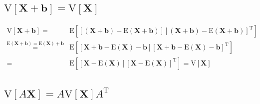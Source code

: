 \documentclass[
]{book}
\theoremstyle{definition}
\theoremstyle{definition}
\theoremstyle{definition}
\theoremstyle{definition}
\theoremstyle{remark}
\begin{document}
\hypertarget{mathrmvleftboldsymbolxboldsymbolbrightmathrmvleftboldsymbolxright}{%
\subsection{\texorpdfstring{\(\mathrm{V}\left[\boldsymbol{X}+\boldsymbol{b}\right]=\mathrm{V}\left[\boldsymbol{X}\right]\)}{\textbackslash mathrm\{V\}\textbackslash left{[}\textbackslash boldsymbol\{X\}+\textbackslash boldsymbol\{b\}\textbackslash right{]}=\textbackslash mathrm\{V\}\textbackslash left{[}\textbackslash boldsymbol\{X\}\textbackslash right{]}}}\label{mathrmvleftboldsymbolxboldsymbolbrightmathrmvleftboldsymbolxright}}

\begin{align*}
\mathrm{V}\left[\boldsymbol{X}+\boldsymbol{b}\right]= & \mathrm{E}\left[\left[\left(\boldsymbol{X}+\boldsymbol{b}\right)-\mathrm{E}\left(\boldsymbol{X}+\boldsymbol{b}\right)\right]\left[\left(\boldsymbol{X}+\boldsymbol{b}\right)-\mathrm{E}\left(\boldsymbol{X}+\boldsymbol{b}\right)\right]^{\mathrm{T}}\right]\\
\overset{\mathrm{E}\left(\boldsymbol{X}+\boldsymbol{b}\right)=\mathrm{E}\left(\boldsymbol{X}\right)+\boldsymbol{b}}{=} & \mathrm{E}\left[\left[\boldsymbol{X}+\boldsymbol{b}-\mathrm{E}\left(\boldsymbol{X}\right)-\boldsymbol{b}\right]\left[\boldsymbol{X}+\boldsymbol{b}-\mathrm{E}\left(\boldsymbol{X}\right)-\boldsymbol{b}\right]^{\mathrm{T}}\right]\\
= & \mathrm{E}\left[\left[\boldsymbol{X}-\mathrm{E}\left(\boldsymbol{X}\right)\right]\left[\boldsymbol{X}-\mathrm{E}\left(\boldsymbol{X}\right)\right]^{\mathrm{T}}\right]=\mathrm{V}\left[\boldsymbol{X}\right]
\end{align*}

\hypertarget{mathrmvleftaboldsymbolxrightamathrmvleftboldsymbolxrightamathrmt}{%
\subsection{\texorpdfstring{\(\mathrm{V}\left[A\boldsymbol{X}\right]=A\mathrm{V}\left[\boldsymbol{X}\right]A^{\mathrm{T}}\)}{\textbackslash mathrm\{V\}\textbackslash left{[}A\textbackslash boldsymbol\{X\}\textbackslash right{]}=A\textbackslash mathrm\{V\}\textbackslash left{[}\textbackslash boldsymbol\{X\}\textbackslash right{]}A\^{}\{\textbackslash mathrm\{T\}\}}}\label{mathrmvleftaboldsymbolxrightamathrmvleftboldsymbolxrightamathrmt}}
\end{document}
